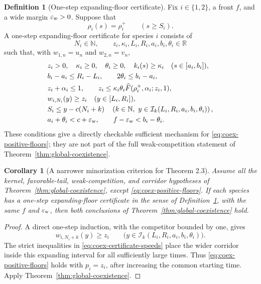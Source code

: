 \documentclass[11pt]{article}
\newtheorem{corollary}[theorem]{Corollary}
\theoremstyle{definition}
\newtheorem{definition}[theorem]{Definition}
\newcommand{\R}{\mathbb R}
\newcommand{\N}{\mathbb N}
\newcommand{\Fhat}{\widehat F}
\begin{document}
\begin{definition}[One-step expanding-floor certificate]
\label{def:floor-certificate}
Fix \(i\in\{1,2\}\), a front \(f\), and a wide margin
\(\varepsilon_{\rm w}>0\).  Suppose that
\[
  \rho_i(s)=\rho_i^+\qquad(s\geq S_i).
\]
A one-step expanding-floor certificate for species \(i\) consists of
\[
  N_i\in\N,\qquad
  z_i,\kappa_i,L_i,R_i,a_i,b_i,\theta_i\in\R
\]
such that, with \(w_{1,n}=u_n\) and \(w_{2,n}=v_n\),
\begin{align}
 &z_i>0,\quad\kappa_i\geq0,\quad\theta_i\geq0,\quad
   k_i(s)\geq\kappa_i\quad(s\in[a_i,b_i]),
   \label{eq:coex-certificate-minorization}\\
 &b_i-a_i\leq R_i-L_i,\qquad
   2\theta_i\leq b_i-a_i,
   \label{eq:coex-certificate-width}\\
 &z_i+\alpha_i\leq1,\qquad
   z_i\leq\kappa_i\theta_i
     \Fhat(\rho_i^+,\alpha_i;z_i,1),
   \label{eq:coex-certificate-reproduction}\\
 &w_{i,N_i}(y)\geq z_i\quad(y\in[L_i,R_i]),
   \label{eq:coex-certificate-seed}\\
 &S_i\leq y-c(N_i+k)
   \quad
   \left(k\in\N,\
   y\in\mathcal I_k(L_i,R_i,a_i,b_i,\theta_i)\right),
   \label{eq:coex-certificate-tail}\\
 &a_i+\theta_i<c+\varepsilon_{\rm w},\qquad
   f-\varepsilon_{\rm w}<b_i-\theta_i.
   \label{eq:coex-certificate-speeds}
\end{align}
These conditions give a directly checkable sufficient mechanism for
\eqref{eq:coex-positive-floors}; they are not part of the full
weak-competition statement of Theorem~\ref{thm:global-coexistence}.
\end{definition}

\begin{corollary}[A narrower minorization criterion for Theorem 2.3]
\label{cor:coexistence-minorization}
Assume all the kernel, favorable-tail, weak-competition, and corridor
hypotheses of Theorem~\ref{thm:global-coexistence}, except
\eqref{eq:coex-positive-floors}.  If each species has a one-step
expanding-floor certificate in the sense of
Definition~\ref{def:floor-certificate}, with the same \(f\) and
\(\varepsilon_{\rm w}\), then both conclusions of
Theorem~\ref{thm:global-coexistence} hold.
\end{corollary}

\begin{proof}
A direct one-step induction, with the competitor bounded by one, gives
\[
  w_{i,N_i+k}(y)\geq z_i
  \qquad
  \bigl(y\in
  \mathcal I_k(L_i,R_i,a_i,b_i,\theta_i)\bigr).
\]
The strict inequalities in
\eqref{eq:coex-certificate-speeds} place the wider corridor inside this
expanding interval for all sufficiently large times.  Thus
\eqref{eq:coex-positive-floors} holds with \(p_i=z_i\), after increasing the
common starting time.  Apply Theorem~\ref{thm:global-coexistence}.
\end{proof}
\end{document}
